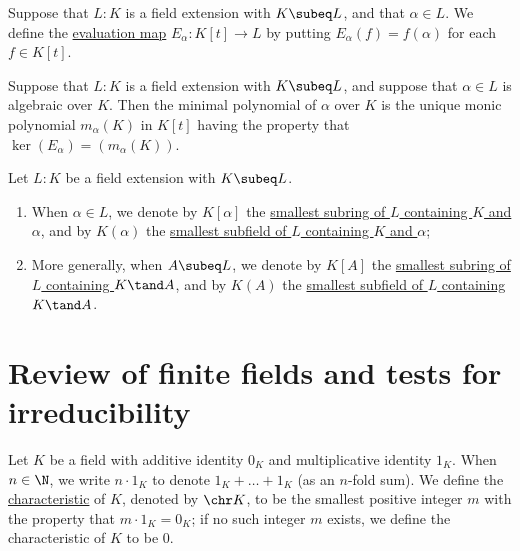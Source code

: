 \documentclass{article}
\begin{document}
  \begin{tdefinition}
    Suppose that \( L: K \) is a field extension with \( K \subeq L \), and that \( \alpha\in L \).
    We define the \ul{evaluation map} \( E_\alpha : K[t] \to L \) by putting \( E_\alpha(f) = f(\alpha) \) for each \( f \in K[t] \).
  \end{tdefinition}

  \begin{tdefinition}
    Suppose that \( L : K \) is a field extension with \( K \subeq L \), and suppose that \( \alpha\in L \) is algebraic over \( K \).
    Then the minimal polynomial of \( \alpha \) over \( K \) is the unique monic polynomial \( m_\alpha(K) \) in \( K[t] \) having the property that \( \ker(E_\alpha) = (m_\alpha(K)) \).
  \end{tdefinition}

  \begin{tdefinition}
    Let \( L:K \) be a field extension with \( K\subeq L \). \begin{enumerate}[label=(\roman*)]
      \item When \( \alpha\in L \), we denote by \( K[\alpha] \) the \ul{smallest subring of \( L \) containing \( K \) and \( \alpha \)}, and by \( K(\alpha) \) the \ul{smallest subfield of \( L \) containing \( K \) and \( \alpha \)};
      \item More generally, when \( A\subeq L \), we denote by \( K[A] \) the \ul{smallest subring of \( L \) containing \( K \tand A \)}, and by \( K(A) \) the \ul{smallest subfield of \( L \) containing \( K \tand A \)}.
    \end{enumerate}
  \end{tdefinition}

\section{Review of finite fields and tests for irreducibility}
  \begin{tdefinition}[Characteristic]
    Let \( K \) be a field with additive identity \( 0_K \) and multiplicative identity \( 1_K \).
    When \( n\in \N \), we write \( n\cdot 1_K \) to denote \( 1_K+\ldots+ 1_K \) (as an \( n \)-fold sum).
    We define the \ul{characteristic} of \( K \), denoted by \( \chr K \), to be the smallest positive integer \( m \) with the property that \( m\cdot 1_K = 0_K \);
    if no such integer \( m \) exists, we define the characteristic of \( K \) to be 0.
  \end{tdefinition}
\end{document}
